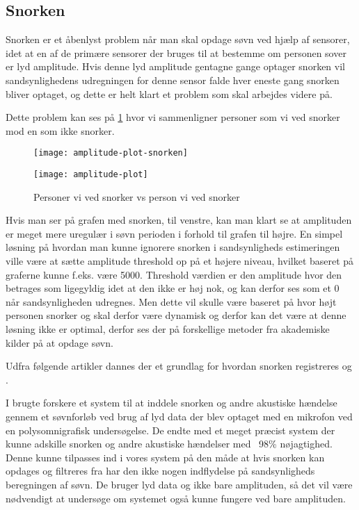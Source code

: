 \subsection{Snorken}\label{section:snorken}
Snorken er et åbenlyst problem når man skal opdage søvn ved hjælp af sensorer, idet at en af de primære sensorer der bruges til at bestemme om personen sover er lyd amplitude.
Hvis denne lyd amplitude gentagne gange optager snorken vil sandsynlighedens udregningen for denne sensor falde hver eneste gang snorken bliver optaget, og dette er helt klart et problem som skal arbejdes videre på.

Dette problem kan ses på \cref{fig:snorke-vs-ikkesnorken} hvor vi sammenligner personer som vi ved snorker mod en som ikke snorker.

\begin{figure}
\begin{minipage}{0.49\textwidth}
\texttt{[image: amplitude-plot-snorken]}
\end{minipage}
\begin{minipage}{0.49\textwidth}
\texttt{[image: amplitude-plot]}
\end{minipage}
\caption{Personer vi ved snorker vs person vi ved snorker}
\label{fig:snorke-vs-ikkesnorken}
\end{figure}

Hvis man ser på grafen med snorken, til venstre, kan man klart se at amplituden er meget mere uregulær i søvn perioden i forhold til grafen til højre. 
En simpel løsning på hvordan man kunne ignorere snorken i sandsynligheds estimeringen ville være at sætte amplitude threshold op på et højere niveau, hvilket baseret på graferne kunne f.eks. være 5000. 
Threshold værdien er den amplitude hvor den betrages som ligegyldig idet at den ikke er høj nok, og kan derfor ses som et 0 når sandsynligheden udregnes. 
Men dette vil skulle være baseret på hvor højt personen snorker og skal derfor være dynamisk og derfor kan det være at denne løsning ikke er optimal, derfor ses der på forskellige metoder fra akademiske kilder på at opdage søvn.

Udfra følgende artikler dannes der et grundlag for hvordan snorken registreres \citep{Dafna2013} og \citep{Calabrese20111101}.

I \citep{Dafna2013} brugte forskere et system til at inddele snorken og andre akustiske hændelse gennem et søvnforløb ved brug af lyd data der blev optaget med en mikrofon ved en polysomnigrafisk undersøgelse. 
De endte med et meget præcist system der kunne adskille snorken og andre akustiske hændelser med ~98\% nøjagtighed.
Denne kunne tilpasses ind i vores system på den måde at hvis snorken kan opdages og filtreres fra har den ikke nogen indflydelse på sandsynligheds beregningen af søvn. 
De bruger lyd data og ikke bare amplituden, så det vil være nødvendigt at undersøge om systemet også kunne fungere ved bare amplituden.

